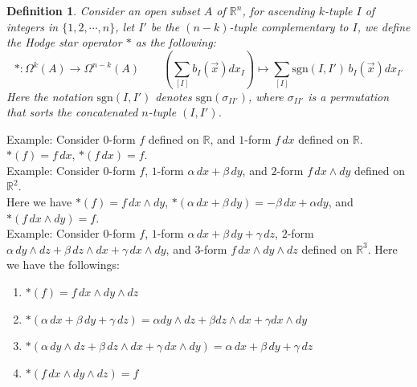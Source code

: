 \documentclass[11pt,oneside]{book}
\theoremstyle{break}
\theoremstyle{break}
\newtheorem{defn}{Definition}[corL]
\newcommand{\R}{\mathbb{R}}
\newcommand{\sgn}{\text{sgn}}
\newcommand{\example}{\color{green}Example: \color{black}}
\begin{document}
\begin{defn}
Consider an open subset $A$ of $\R^n$, for ascending $k$-tuple $I$ of integers in $\{1,2,\cdots, n\}$, let $I'$ be the $(n-k)$-tuple complementary to $I$, we define the Hodge star operator $*$ as the following: 
$$ *: \Omega^k(A) \to \Omega^{n-k}(A) \qquad\left(\sum_{[I]}b_I(\vec{x}) dx_I\right) \mapsto \sum_{[I]}\text{sgn}(I,I')\, b_I(\vec{x}) dx_{I'}$$
Here the notation $\text{sgn}(I,I')$ denotes $\sgn(\sigma_{II'})$, where $\sigma_{II'}$ is a permutation that sorts the concatenated $n$-tuple $(I,I')$.
\end{defn}

\example
Consider $0$-form $f$ defined on $\R$, and $1$-form $f\, dx$ defined on $\R$. $*(f) = f\,dx$, $*(f\, dx) = f$.\\

\example
Consider $0$-form $f$, $1$-form $\alpha\, dx+ \beta \, dy$, and $2$-form $f\, dx \wedge dy$ defined on $\R^2$. \\
Here we have $*(f) = f\, dx\wedge dy$, $*(\alpha\, dx + \beta \, dy) = -\beta \, dx + \alpha dy$, and $*(f\, dx \wedge dy) = f$. \\

\example
Consider $0$-form $f$, $1$-form $\alpha \, dx + \beta \, dy + \gamma \, dz$, $2$-form $\alpha\, dy \wedge dz + \beta\, dz \wedge dx + \gamma\, dx \wedge dy$, and $3$-form $f\, dx\wedge dy \wedge dz$ defined on $\R^3$. Here we have the followings:
\begin{enumerate}[topsep=3pt,itemsep=-1ex,partopsep=1ex,parsep=1ex]
\item $*(f) = f\, dx \wedge dy \wedge dz$ 
\item $*(\alpha \, dx + \beta \, dy + \gamma \, dz) = \alpha dy \wedge dz + \beta dz \wedge dx + \gamma dx \wedge dy$
\item $*(\alpha\, dy \wedge dz + \beta\, dz \wedge dx + \gamma\, dx \wedge dy) = \alpha\, dx + \beta \, dy + \gamma \, dz$
\item $*(f\, dx\wedge dy \wedge dz) = f$
\end{enumerate}
\end{document}
